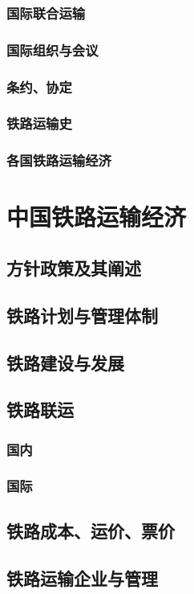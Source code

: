 \documentclass[UTF8]{../../RepresentationUniverse}
\begin{document}
    \subsubsection{国际联合运输}
    \subsubsection{国际组织与会议}
    \subsubsection{条约、协定}
    \subsubsection{铁路运输史}
    \subsubsection{各国铁路运输经济}
    

\section{中国铁路运输经济}
    \subsection{方针政策及其阐述}
    \subsection{铁路计划与管理体制}
    \subsection{铁路建设与发展}
    \subsection{铁路联运}
        \subsubsection{国内}
        \subsubsection{国际}
    \subsection{铁路成本、运价、票价}
    \subsection{铁路运输企业与管理}
\end{document}
